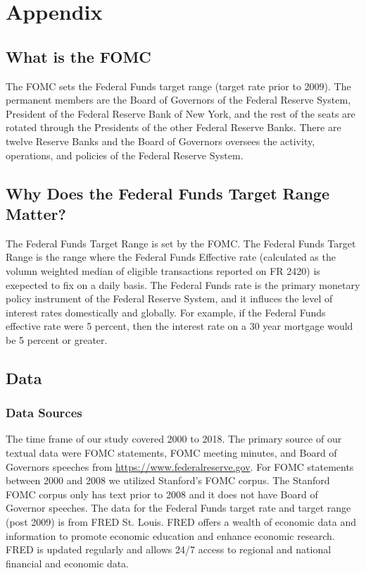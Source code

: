 \documentclass[11pt]{article}
\begin{document}
{\appendix
\section{Appendix}

\subsection{What is the FOMC}

The FOMC sets the Federal Funds target range (target rate prior to 2009).  The permanent members are the Board of Governors of the Federal Reserve System, President of the Federal Reserve Bank of New York, and the rest of the seats are rotated through the Presidents of the other Federal Reserve Banks.  There are twelve Reserve Banks and the Board of Governors oversees the activity, operations, and policies of the Federal Reserve System.   

\subsection{Why Does the Federal Funds Target Range Matter?}

The Federal Funds Target Range is set by the FOMC.  The Federal Funds Target Range is the range where the Federal Funds Effective rate (calculated as the volumn weighted median of eligible transactions reported on FR 2420) is exepected to fix on a daily basis.  The Federal Funds rate is the primary monetary policy instrument of the Federal Reserve System, and it influces the level of interest rates domestically and globally.  For example, if the Federal Funds effective rate were 5 percent, then the interest rate on a 30 year mortgage would be 5 percent or greater.  

\subsection{Data}

\subsubsection{Data Sources}
The time frame of our study covered 2000 to 2018.  
The primary source of our textual data were FOMC statements, FOMC meeting minutes, and Board of Governors speeches from \url{https://www.federalreserve.gov}.  
For FOMC statements between 2000 and 2008 we utilized Stanford's FOMC corpus.  
The Stanford FOMC corpus only has text prior to 2008 and it does not have Board of Governor speeches.
The data for the Federal Funds target rate and target range (post 2009) is from FRED St. Louis.  
FRED offers a wealth of economic data and information to promote economic education and enhance economic research. 
FRED is updated regularly and allows 24/7 access to regional and national financial and economic data.


}
\end{document}
